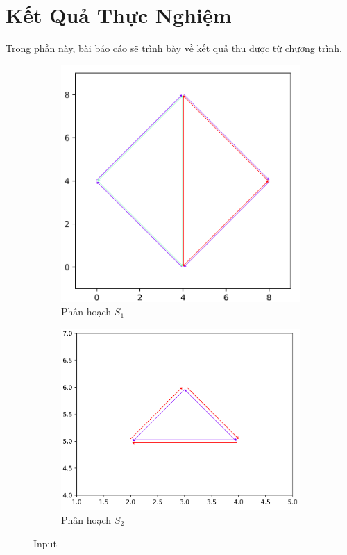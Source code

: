 \documentclass[15pt]{article}
\begin{document}
{\section{Kết Quả Thực Nghiệm}
Trong phần này, bài báo cáo sẽ trình bày về kết quả thu được từ chương trình.
\newpage
\begin{figure}
\begin{subfigure}{.5\textwidth}
  \centering
  \includegraphics[width=.8\linewidth]{dcel1_ex.png}
  \caption{Phân hoạch $S_1$}
  \label{fig:sfig1}
\end{subfigure}%
\begin{subfigure}{.5\textwidth}
  \centering
  \includegraphics[width=.8\linewidth]{dcel2_ex.png}
  \caption{Phân hoạch $S_2$}
  \label{fig:sfig2}
\end{subfigure}
\caption{Input}
\label{fig:fig}

\end{figure}}
\end{document}
